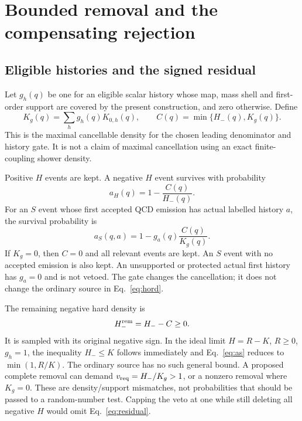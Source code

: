\documentclass[11pt,a4paper]{article}
\begin{document}
\section{Bounded removal and the compensating rejection}
\label{sec:rejection}

\subsection{Eligible histories and the signed residual}
Let $g_h(q)$ be one for an eligible scalar history whose map, mass shell
and first-order support are covered by the present construction, and
zero otherwise. Define
\begin{equation}
 K_g(q)=\sum_h g_h(q)K_{0,h}(q),\qquad
 C(q)=\min\{H_-(q),K_g(q)\}.
 \label{eq:cancel}
\end{equation}
This is the maximal cancellable density for the chosen leading
denominator and history gate. It is not a claim of maximal cancellation
using an exact finite-coupling shower density.

Positive $H$ events are kept. A negative $H$ event survives with
probability
\begin{equation}
 a_H(q)=1-\frac{C(q)}{H_-(q)}.
 \label{eq:ah}
\end{equation}
For an $S$ event whose first accepted QCD emission has actual labelled
history $a$, the survival probability is
\begin{equation}
 a_S(q,a)=1-g_a(q)\frac{C(q)}{K_g(q)}.
 \label{eq:as}
\end{equation}
If $K_g=0$, then $C=0$ and all relevant events are kept. An $S$ event
with no accepted emission is also kept. An unsupported or protected
actual first history has $g_a=0$ and is not vetoed. The gate changes the
cancellation; it does not change the ordinary source in
Eq.~\eqref{eq:hord}.

The remaining negative hard density is
\begin{equation}
 H_-^{\rm rem}=H_--C\ge0.
 \label{eq:residual}
\end{equation}
It is sampled with its original negative sign. In the ideal limit
$H=R-K$, $R\ge0$, $g_h=1$, the inequality $H_-\le K$ follows
immediately and Eq.~\eqref{eq:as} reduces to $\min(1,R/K)$.
The ordinary source has no such general bound. A proposed complete
removal can demand $v_{\rm req}=H_-/K_g>1$, or a nonzero removal where
$K_g=0$. These are density/support mismatches, not probabilities that
should be passed to a random-number test. Capping the veto at one while
still deleting all negative $H$ would omit Eq.~\eqref{eq:residual}.
\end{document}
